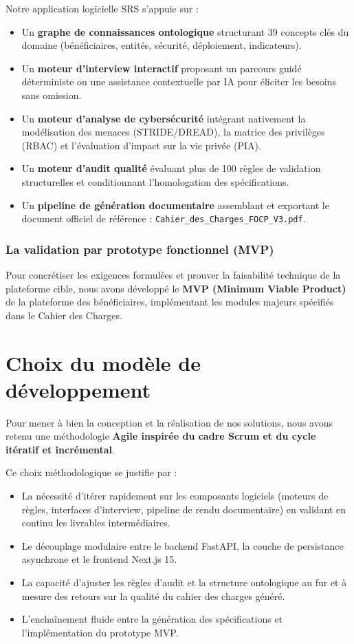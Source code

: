 Notre application logicielle SRS s'appuie sur :
\begin{itemize}
    \item Un \textbf{graphe de connaissances ontologique} structurant 39 concepts clés du domaine (bénéficiaires, entités, sécurité, déploiement, indicateurs).
    \item Un \textbf{moteur d'interview interactif} proposant un parcours guidé déterministe ou une assistance contextuelle par IA pour éliciter les besoins sans omission.
    \item Un \textbf{moteur d'analyse de cybersécurité} intégrant nativement la modélisation des menaces (STRIDE/DREAD), la matrice des privilèges (RBAC) et l'évaluation d'impact sur la vie privée (PIA).
    \item Un \textbf{moteur d'audit qualité} évaluant plus de 100 règles de validation structurelles et conditionnant l'homologation des spécifications.
    \item Un \textbf{pipeline de génération documentaire} assemblant et exportant le document officiel de référence : \texttt{Cahier\_des\_Charges\_FOCP\_V3.pdf}.
\end{itemize}

\subsubsection{La validation par prototype fonctionnel (MVP)}
Pour concrétiser les exigences formulées et prouver la faisabilité technique de la plateforme cible, nous avons développé le \textbf{MVP (Minimum Viable Product)} de la plateforme des bénéficiaires, implémentant les modules majeurs spécifiés dans le Cahier des Charges.

\section{Choix du modèle de développement}

Pour mener à bien la conception et la réalisation de nos solutions, nous avons retenu une méthodologie \textbf{Agile inspirée du cadre Scrum et du cycle itératif et incrémental}.

Ce choix méthodologique se justifie par :
\begin{itemize}
    \item La nécessité d'itérer rapidement sur les composants logiciels (moteurs de règles, interfaces d'interview, pipeline de rendu documentaire) en validant en continu les livrables intermédiaires.
    \item Le découplage modulaire entre le backend FastAPI, la couche de persistance asynchrone et le frontend Next.js 15.
    \item La capacité d'ajuster les règles d'audit et la structure ontologique au fur et à mesure des retours sur la qualité du cahier des charges généré.
    \item L'enchaînement fluide entre la génération des spécifications et l'implémentation du prototype MVP.
\end{itemize}

